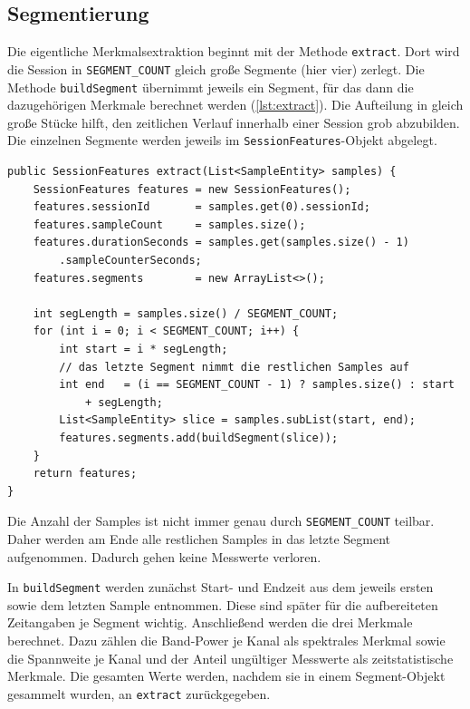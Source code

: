 \subsection{Segmentierung} Die eigentliche Merkmalsextraktion beginnt mit der Methode \texttt{extract}. Dort wird die Session in \texttt{SEGMENT\_COUNT} gleich große Segmente (hier vier) zerlegt. Die Methode \texttt{build\-Segment} übernimmt jeweils ein Segment, für das dann die dazugehörigen Merkmale berechnet werden (\autoref{lst:extract}). Die Aufteilung in gleich große Stücke hilft, den zeitlichen Verlauf innerhalb einer Session grob abzubilden. Die einzelnen Segmente werden jeweils im \texttt{SessionFeatures}-Objekt abgelegt.
\begin{lstlisting}[style=code, caption={[Zerlegung in Segmente]Zerlegung der Session in Segmente. Das letzte Segment nimmt die verbleibenden Samples auf, damit keine Messwerte verloren gehen.}, label={lst:extract}]
public SessionFeatures extract(List<SampleEntity> samples) {
    SessionFeatures features = new SessionFeatures();
    features.sessionId       = samples.get(0).sessionId;
    features.sampleCount     = samples.size();
    features.durationSeconds = samples.get(samples.size() - 1)
        .sampleCounterSeconds;
    features.segments        = new ArrayList<>();

    int segLength = samples.size() / SEGMENT_COUNT;
    for (int i = 0; i < SEGMENT_COUNT; i++) {
        int start = i * segLength;
        // das letzte Segment nimmt die restlichen Samples auf
        int end   = (i == SEGMENT_COUNT - 1) ? samples.size() : start
            + segLength;
        List<SampleEntity> slice = samples.subList(start, end);
        features.segments.add(buildSegment(slice));
    }
    return features;
}
\end{lstlisting}

\noindent Die Anzahl der Samples ist nicht immer genau durch \texttt{SEGMENT\_COUNT} teilbar. Daher werden am Ende alle restlichen Samples in das letzte Segment aufgenommen. Dadurch gehen keine Messwerte verloren.
\vspace{\baselineskip}

\noindent In \texttt{buildSegment} werden zunächst Start- und Endzeit aus dem jeweils ersten sowie dem letzten Sample entnommen. Diese sind später für die aufbereiteten Zeitangaben je Segment wichtig. Anschließend werden die drei Merkmale berechnet. Dazu zählen die Band-Power je Kanal als spektrales Merkmal sowie die Spannweite je Kanal und der Anteil ungültiger Messwerte als zeitstatistische Merkmale. Die gesamten Werte werden, nachdem sie in einem Segment-Objekt gesammelt wurden, an \texttt{extract} zurückgegeben.
\newpage

